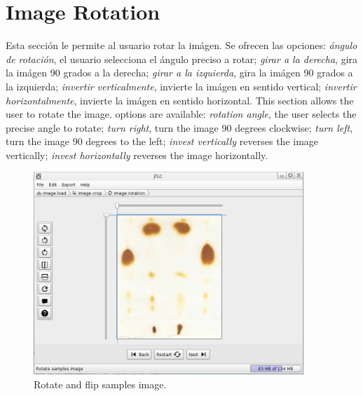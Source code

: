 \section{Image Rotation}
Esta secci\'on le permite al usuario rotar la im\'agen. Se ofrecen las opciones: \emph{\'angulo de rotaci\'on}, el usuario selecciona el \'angulo preciso a rotar; \emph{girar a la derecha}, gira la im\'agen 90 grados a la derecha; \emph{girar a la izquierda}, gira la im\'agen 90 grados a la izquierda; \emph{invertir verticalmente}, invierte la im\'agen en sentido vertical; \emph{invertir horizontalmente}, invierte la im\'agen en sentido horizontal.
This section allows the user to rotate the image. options are available: \emph{rotation angle}, the user selects the precise angle to rotate; \emph{turn right}, turn the image 90 degrees clockwise; \emph{turn left}, turn the image 90 degrees to the left; \emph{invest vertically} reverses the image vertically; \emph{invest horizontally} reverses the image horizontally.
\begin{figure}[H]
	\vspace{0cm}
	\centering
	\includegraphics[width=385px]{imagenes/rotate}
	\centering
	\vspace{-0.4cm}
	\caption{Rotate and flip samples image.}
	\label{fig:image_rot}
	\vspace{-0.25cm}
\end{figure}

